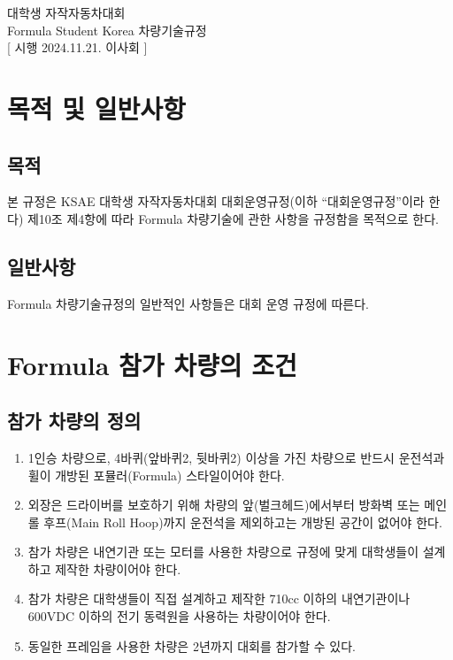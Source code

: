 \documentclass[final,a4paper,10pt]{report}
\begin{document}
\begin{center}
  {\fontsize{22}{25}\selectfont\pretendardb 대학생 자작자동차대회}\\[2.5ex]
  {\fontsize{22}{25}\selectfont\pretendardb Formula Student Korea 차량기술규정}\\[2.5ex]
  [ 시행 2024.11.21. 이사회 ]
\end{center}

\chapter{목적 및 일반사항}

\section{목적}
본 규정은 KSAE 대학생 자작자동차대회 대회운영규정(이하 “대회운영규정”이라 한다) 제10조 제4항에 따라 Formula 차량기술에 관한 사항을 규정함을 목적으로 한다.

\section{일반사항}
Formula 차량기술규정의 일반적인 사항들은 대회 운영 규정에 따른다.

\chapter{Formula 참가 차량의 조건}

\section{참가 차량의 정의}
\begin{enumerate}
  \item 1인승 차량으로, 4바퀴(앞바퀴2, 뒷바퀴2) 이상을 가진 차량으로 반드시 운전석과 휠이 개방된 포뮬러(Formula) 스타일이어야 한다.
  \item 외장은 드라이버를 보호하기 위해 차량의 앞(벌크헤드)에서부터 방화벽 또는 메인 롤 후프(Main Roll Hoop)까지 운전석을 제외하고는 개방된 공간이 없어야 한다.
  \item 참가 차량은 내연기관 또는 모터를 사용한 차량으로 규정에 맞게 대학생들이 설계하고 제작한 차량이어야 한다.
  \item 참가 차량은 대학생들이 직접 설계하고 제작한 710cc 이하의 내연기관이나 600VDC 이하의 전기 동력원을 사용하는 차량이어야 한다.
  \item 동일한 프레임을 사용한 차량은 2년까지 대회를 참가할 수 있다. 
\end{enumerate}
\end{document}
